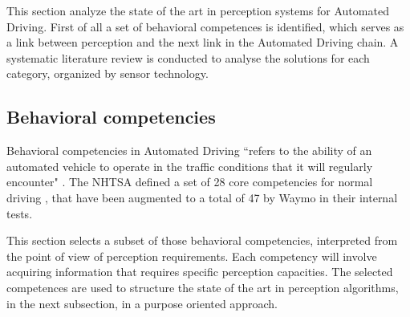 
This section analyze the state of the art in perception systems for Automated
Driving. First of all a set of behavioral competences is identified, which
serves as a link between perception and the next link in the Automated
Driving chain. A systematic literature review is conducted to analyse the 
solutions for each category, organized by sensor technology.

\subsection{Behavioral competencies}

Behavioral competencies in Automated Driving ``refers to the ability of an 
automated vehicle to operate in the traffic conditions that it will regularly
encounter" \cite{Nowakowski2015}. The NHTSA defined a set of 28 core 
competencies for normal driving \cite{NHTSA2016}, that have been augmented to a 
total of 47 by Waymo \cite{Waymo2017} in their internal tests.

This section selects a subset of those behavioral competencies, interpreted
from the point of view of perception requirements. Each competency will 
involve acquiring information that requires specific perception capacities.
The selected competences are used to structure the state of the art in
perception algorithms, in the next subsection, in a purpose oriented approach.

